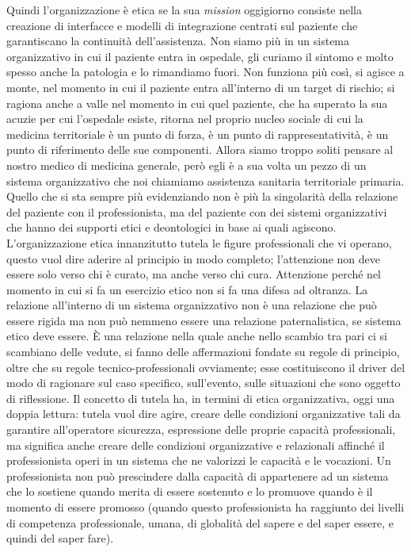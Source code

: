 Quindi l'organizzazione è etica se la sua \emph{mission} oggigiorno
consiste nella creazione di interfacce e modelli di integrazione
centrati sul paziente che garantiscano la continuità dell'assistenza.
Non siamo più in un sistema organizzativo in cui il paziente entra in
ospedale, gli curiamo il sintomo e molto spesso anche la patologia e lo
rimandiamo fuori. Non funziona più così, si agisce a monte, nel momento
in cui il paziente entra all'interno di un target di rischio; si ragiona
anche a valle nel momento in cui quel paziente, che ha superato la sua
acuzie per cui l'ospedale esiste, ritorna nel proprio nucleo sociale di
cui la medicina territoriale è un punto di forza, è un punto di
rappresentatività, è un punto di riferimento delle sue componenti.
Allora siamo troppo soliti pensare al nostro medico di medicina
generale, però egli è a sua volta un pezzo di un sistema organizzativo
che noi chiamiamo assistenza sanitaria territoriale primaria. Quello che
si sta sempre più evidenziando non è più la singolarità della relazione
del paziente con il professionista, ma del paziente con dei sistemi
organizzativi che hanno dei supporti etici e deontologici in base ai
quali agiscono. L'organizzazione etica innanzitutto tutela le figure
professionali che vi operano, questo vuol dire aderire al principio in
modo completo; l'attenzione non deve essere solo verso chi è curato, ma
anche verso chi cura. Attenzione perché nel momento in cui si fa un
esercizio etico non si fa una difesa ad oltranza. La relazione
all'interno di un sistema organizzativo non è una relazione che può
essere rigida ma non può nemmeno essere una relazione paternalistica, se
sistema etico deve essere. È una relazione nella quale anche nello
scambio tra pari ci si scambiano delle vedute, si fanno delle
affermazioni fondate su regole di principio, oltre che su regole
tecnico-professionali ovviamente; esse costituiscono il driver del modo
di ragionare sul caso specifico, sull'evento, sulle situazioni che sono
oggetto di riflessione. Il concetto di tutela ha, in termini di etica
organizzativa, oggi una doppia lettura: tutela vuol dire agire, creare
delle condizioni organizzative tali da garantire all'operatore
sicurezza, espressione delle proprie capacità professionali, ma
significa anche creare delle condizioni organizzative e relazionali
affinché il professionista operi in un sistema che ne valorizzi le
capacità e le vocazioni. Un professionista non può prescindere dalla
capacità di appartenere ad un sistema che lo sostiene quando merita di
essere sostenuto e lo promuove quando è il momento di essere promosso
(quando questo professionista ha raggiunto dei livelli di competenza
professionale, umana, di globalità del sapere e del saper essere, e
quindi del saper fare).

